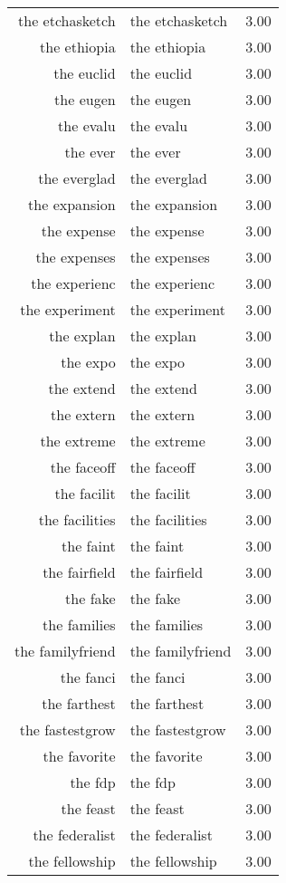 \begin{table}[ht]
\begin{tabular}{rlr}
  the etchasketch & the etchasketch & 3.00 \\ 
  the ethiopia & the ethiopia & 3.00 \\ 
  the euclid & the euclid & 3.00 \\ 
  the eugen & the eugen & 3.00 \\ 
  the evalu & the evalu & 3.00 \\ 
  the ever & the ever & 3.00 \\ 
  the everglad & the everglad & 3.00 \\ 
  the expansion & the expansion & 3.00 \\ 
  the expense & the expense & 3.00 \\ 
  the expenses & the expenses & 3.00 \\ 
  the experienc & the experienc & 3.00 \\ 
  the experiment & the experiment & 3.00 \\ 
  the explan & the explan & 3.00 \\ 
  the expo & the expo & 3.00 \\ 
  the extend & the extend & 3.00 \\ 
  the extern & the extern & 3.00 \\ 
  the extreme & the extreme & 3.00 \\ 
  the faceoff & the faceoff & 3.00 \\ 
  the facilit & the facilit & 3.00 \\ 
  the facilities & the facilities & 3.00 \\ 
  the faint & the faint & 3.00 \\ 
  the fairfield & the fairfield & 3.00 \\ 
  the fake & the fake & 3.00 \\ 
  the families & the families & 3.00 \\ 
  the familyfriend & the familyfriend & 3.00 \\ 
  the fanci & the fanci & 3.00 \\ 
  the farthest & the farthest & 3.00 \\ 
  the fastestgrow & the fastestgrow & 3.00 \\ 
  the favorite & the favorite & 3.00 \\ 
  the fdp & the fdp & 3.00 \\ 
  the feast & the feast & 3.00 \\ 
  the federalist & the federalist & 3.00 \\ 
  the fellowship & the fellowship & 3.00 \\ 

\end{tabular}
\end{table}

